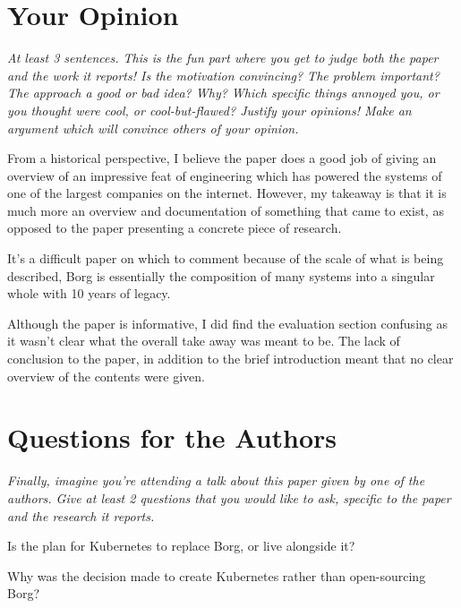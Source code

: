 \documentclass[11pt]{article}
\begin{document}
\section*{Your Opinion}

\textsl{At least 3 sentences. This is the fun part where you get to judge both
the paper and the work it reports! Is the motivation convincing? The problem
important? The approach a good or bad idea? Why? Which specific things annoyed
you, or you thought were cool, or cool-but-flawed? Justify your opinions! Make
an argument which will convince others of your opinion.}

From a historical perspective, I believe the paper does a good job of giving an
overview of an impressive feat of engineering which has powered the systems of
one of the largest companies on the internet. However, my takeaway is that it
is much more an overview and documentation of something that came to exist, as
opposed to the paper presenting a concrete piece of research.

It's a difficult paper on which to comment because of the scale of what is
being described, Borg is essentially the composition of many systems into a
singular whole with 10 years of legacy.

Although the paper is informative, I did find the evaluation section confusing
as it wasn't clear what the overall take away was meant to be. The lack of
conclusion to the paper, in addition to the brief introduction meant that no
clear overview of the contents were given.

\section*{Questions for the Authors}

\textsl{Finally, imagine you're attending a talk about this paper given by one
of the authors. Give at least 2 questions that you would like to ask, specific
to the paper and the research it reports.}

Is the plan for Kubernetes to replace Borg, or live alongside it?

Why was the decision made to create Kubernetes rather than open-sourcing Borg?




\end{document}
